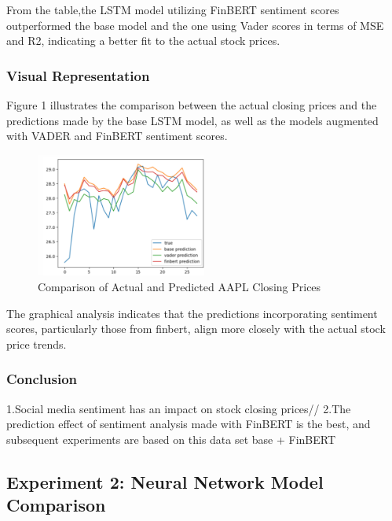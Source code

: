 \documentclass[11pt,a4paper]{article}
\begin{document}
          
    From the table,the LSTM model utilizing FinBERT sentiment
    scores outperformed the base model and the one
    using Vader scores in terms of MSE and R2,
    indicating a better fit to the actual stock prices.    



    \subsubsection{Visual Representation}
    Figure 1 illustrates the comparison between the actual closing prices and the predictions made by the base LSTM model, as well as the models augmented with VADER and FinBERT sentiment scores.
    
    \begin{figure}[ht]
    \includegraphics[width=0.5\textwidth]{figs/2023-11-29_220912.jpg}
    \caption{Comparison of Actual and Predicted AAPL Closing Prices}
    \label{fig:sentiment_validation}
    \end{figure}
    
    The graphical analysis indicates that the predictions incorporating sentiment scores, particularly those from finbert, align more closely with the actual stock price trends.
    

    \subsubsection{Conclusion}
    1.Social media sentiment has an impact on stock closing prices//
    2.The prediction effect of sentiment analysis made with FinBERT is the best, and subsequent experiments are based on this data set base + FinBERT



  \subsection{Experiment 2: Neural Network Model Comparison}
  \label{sec:experiment2}
  
\end{document}
